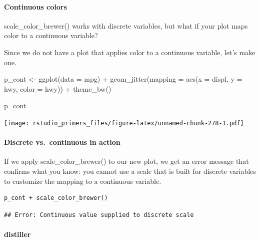 \documentclass[
]{article}
\newenvironment{Shaded}{\begin{snugshade}}{\end{snugshade}}
\newcommand{\AttributeTok}[1]{\textcolor[rgb]{0.77,0.63,0.00}{#1}}
\newcommand{\FunctionTok}[1]{\textcolor[rgb]{0.00,0.00,0.00}{#1}}
\newcommand{\NormalTok}[1]{#1}
\newcommand{\OtherTok}[1]{\textcolor[rgb]{0.56,0.35,0.01}{#1}}
\newcommand{\SpecialCharTok}[1]{\textcolor[rgb]{0.00,0.00,0.00}{#1}}
\begin{document}
\hypertarget{continuous-colors}{%
\paragraph{Continuous colors}\label{continuous-colors}}

scale\_color\_brewer() works with discrete variables, but what if your
plot maps color to a continuous variable?

Since we do not have a plot that applies color to a continuous variable,
let's make one.

\begin{Shaded}
\begin{Highlighting}[]
\NormalTok{p\_cont }\OtherTok{\textless{}{-}} \FunctionTok{ggplot}\NormalTok{(}\AttributeTok{data =}\NormalTok{ mpg) }\SpecialCharTok{+} 
  \FunctionTok{geom\_jitter}\NormalTok{(}\AttributeTok{mapping =} \FunctionTok{aes}\NormalTok{(}\AttributeTok{x =}\NormalTok{ displ, }\AttributeTok{y =}\NormalTok{ hwy, }\AttributeTok{color =}\NormalTok{ hwy)) }\SpecialCharTok{+}
  \FunctionTok{theme\_bw}\NormalTok{()}

\NormalTok{p\_cont}
\end{Highlighting}
\end{Shaded}

\texttt{[image: rstudio\_primers\_files/figure-latex/unnamed-chunk-278-1.pdf]}

\hypertarget{discrete-vs.-continuous-in-action}{%
\paragraph{Discrete vs.~continuous in
action}\label{discrete-vs.-continuous-in-action}}

If we apply scale\_color\_brewer() to our new plot, we get an error
message that confirms what you know: you cannot use a scale that is
built for discrete variables to customize the mapping to a continuous
variable.

\begin{verbatim}
p_cont + scale_color_brewer()
\end{verbatim}

\begin{verbatim}
## Error: Continuous value supplied to discrete scale
\end{verbatim}

\hypertarget{distiller}{%
\paragraph{distiller}\label{distiller}}
\end{document}
